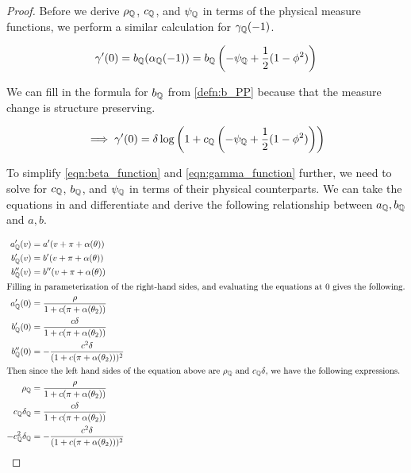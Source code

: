 \documentclass[11pt, letterpaper, twoside, final]{article}
\begin{document}
\begin{appendices}
\begin{proof}
Before we derive $\rho_{\mathbb{Q}}$, $c_{\mathbb{Q}}$, and $\psi_{\mathbb{Q}}$ in terms of the physical measure functions, we perform
a similar calculation for $\gamma_{\mathbb{Q}}(-1)$.

\begin{equation}
    \label{eqn:gamma_qq_at_minus_one}
    \gamma'(0) = b_{\mathbb{Q}}(\alpha_{\mathbb{Q}}(-1))  = b_{\mathbb{Q}}\left(-\psi_{\mathbb{Q}} + \frac{1}{2} (1- \phi^2)\right)  
\end{equation}

We can fill in the formula for $b_{\mathbb{Q}}$ from \cref{defn:b_PP} because that the measure change is structure
preserving.

\begin{equation}
    \implies \gamma'(0) = \delta \log\left(1 + c_{\mathbb{Q}} \left(-\psi_{\mathbb{Q}} + \frac{1}{2} (1-
    \phi^2)\right)\right)
    \label{eqn:gamma_function_QQ}
\end{equation}

To simplify \cref{eqn:beta_function} and \cref{eqn:gamma_function} further, we need to solve for $c_{\mathbb{Q}}$,
$b_{\mathbb{Q}}$, and $\psi_{\mathbb{Q}}$  in terms of their physical counterparts.
We can take the equations in \textcite[Proposition 5]{khrapov2016affine} and differentiate and derive the
following relationship between $a_{\mathbb{Q}}, b_{\mathbb{Q}}$ and $a, b$.

\begin{align}
    a_{\QQ}'(v) &= a'(v + \pi + \alpha(\theta))  \nonumber \\
%
    b_{\QQ}'(v) &= b'(v + \pi + \alpha(\theta))  \\
%
    b_{\QQ}''(v) &= b''(v + \pi + \alpha(\theta))  \nonumber \\
%
    \intertext{Filling in parameterization of the right-hand sides, and evaluating the equations at $0$ gives the
    following.} 
%
    a_{\QQ}'(0) &= \frac{\rho}{1 + c(\pi + \alpha(\theta_2))} \nonumber \\
%
    b_{\QQ}'(0) &= \frac{c \delta}{1 + c(\pi + \alpha(\theta_2))} \\
%
    b_{\QQ}''(0) &= -\frac{c^2 \delta}{(1 + c(\pi + \alpha(\theta_2)))^2} \nonumber \\
%
    \intertext{Then since the left hand sides of the equation above are $\rho_{\QQ}$ and $c_{\QQ} \delta$, we
    have the following expressions.}
%
    \rho_{\QQ} &= \frac{\rho}{1 + c(\pi + \alpha(\theta_2))} \nonumber \\
%
    \label{eqn:c_rho_delta_QQ}
    c_{\QQ} \delta_{\QQ} &= \frac{c \delta}{1 + c(\pi + \alpha(\theta_2))}  \\
%
    -c_{\QQ}^2 \delta_{\QQ} &= -\frac{c^2 \delta}{(1 + c(\pi + \alpha(\theta_2)))^2}
    \nonumber
\end{align}


\end{proof}
\end{appendices}
\end{document}
